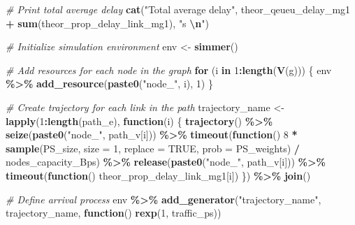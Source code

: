 \documentclass[
]{article}
\newenvironment{Shaded}{\begin{snugshade}}{\end{snugshade}}
\newcommand{\AttributeTok}[1]{\textcolor[rgb]{0.13,0.29,0.53}{#1}}
\newcommand{\CommentTok}[1]{\textcolor[rgb]{0.56,0.35,0.01}{\textit{#1}}}
\newcommand{\ConstantTok}[1]{\textcolor[rgb]{0.56,0.35,0.01}{#1}}
\newcommand{\ControlFlowTok}[1]{\textcolor[rgb]{0.13,0.29,0.53}{\textbf{#1}}}
\newcommand{\DecValTok}[1]{\textcolor[rgb]{0.00,0.00,0.81}{#1}}
\newcommand{\FunctionTok}[1]{\textcolor[rgb]{0.13,0.29,0.53}{\textbf{#1}}}
\newcommand{\NormalTok}[1]{#1}
\newcommand{\OtherTok}[1]{\textcolor[rgb]{0.56,0.35,0.01}{#1}}
\newcommand{\SpecialCharTok}[1]{\textcolor[rgb]{0.81,0.36,0.00}{\textbf{#1}}}
\newcommand{\StringTok}[1]{\textcolor[rgb]{0.31,0.60,0.02}{#1}}
\begin{document}
\begin{Shaded}
\begin{Highlighting}[]
  \CommentTok{\# Print total average delay}
  \FunctionTok{cat}\NormalTok{(}\StringTok{"Total average delay"}\NormalTok{, theor\_qeueu\_delay\_mg1 }\SpecialCharTok{+} \FunctionTok{sum}\NormalTok{(theor\_prop\_delay\_link\_mg1), }\StringTok{"s }\SpecialCharTok{\textbackslash{}n}\StringTok{"}\NormalTok{)}
  
  \CommentTok{\# Initialize simulation environment}
\NormalTok{  env }\OtherTok{\textless{}{-}} \FunctionTok{simmer}\NormalTok{()}
  
  \CommentTok{\# Add resources for each node in the graph}
  \ControlFlowTok{for}\NormalTok{ (i }\ControlFlowTok{in} \DecValTok{1}\SpecialCharTok{:}\FunctionTok{length}\NormalTok{(}\FunctionTok{V}\NormalTok{(g))) \{}
\NormalTok{    env }\SpecialCharTok{\%\textgreater{}\%} \FunctionTok{add\_resource}\NormalTok{(}\FunctionTok{paste0}\NormalTok{(}\StringTok{"node\_"}\NormalTok{, i), }\DecValTok{1}\NormalTok{) }
\NormalTok{  \}  }
  
  \CommentTok{\# Create trajectory for each link in the path}
\NormalTok{  trajectory\_name }\OtherTok{\textless{}{-}} \FunctionTok{lapply}\NormalTok{(}\DecValTok{1}\SpecialCharTok{:}\FunctionTok{length}\NormalTok{(path\_e), }\ControlFlowTok{function}\NormalTok{(i) \{}
    \FunctionTok{trajectory}\NormalTok{() }\SpecialCharTok{\%\textgreater{}\%}
      \FunctionTok{seize}\NormalTok{(}\FunctionTok{paste0}\NormalTok{(}\StringTok{"node\_"}\NormalTok{, path\_v[i])) }\SpecialCharTok{\%\textgreater{}\%}
      \FunctionTok{timeout}\NormalTok{(}\ControlFlowTok{function}\NormalTok{() }\DecValTok{8} \SpecialCharTok{*} \FunctionTok{sample}\NormalTok{(PS\_size, }\AttributeTok{size =} \DecValTok{1}\NormalTok{, }\AttributeTok{replace =} \ConstantTok{TRUE}\NormalTok{, }\AttributeTok{prob =}\NormalTok{ PS\_weights) }\SpecialCharTok{/}\NormalTok{ nodes\_capacity\_Bps) }\SpecialCharTok{\%\textgreater{}\%}
      \FunctionTok{release}\NormalTok{(}\FunctionTok{paste0}\NormalTok{(}\StringTok{"node\_"}\NormalTok{, path\_v[i])) }\SpecialCharTok{\%\textgreater{}\%}
      \FunctionTok{timeout}\NormalTok{(}\ControlFlowTok{function}\NormalTok{() theor\_prop\_delay\_link\_mg1[i])}
\NormalTok{  \}) }\SpecialCharTok{\%\textgreater{}\%} \FunctionTok{join}\NormalTok{()}
  
  \CommentTok{\# Define arrival process}
\NormalTok{  env }\SpecialCharTok{\%\textgreater{}\%} \FunctionTok{add\_generator}\NormalTok{(}\StringTok{"trajectory\_name"}\NormalTok{, trajectory\_name, }\ControlFlowTok{function}\NormalTok{() }\FunctionTok{rexp}\NormalTok{(}\DecValTok{1}\NormalTok{, traffic\_ps))}
  

\end{Highlighting}
\end{Shaded}
\end{document}
